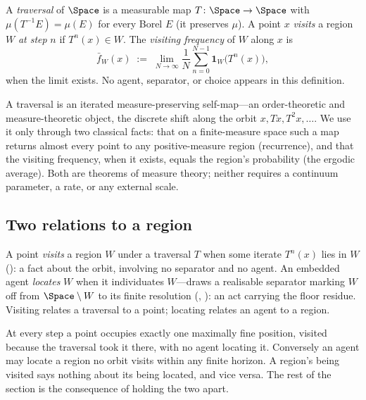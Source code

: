 \begin{definition}
\label{def:traversal}
A \emph{traversal} of $\Space$ is a measurable map $T\colon\Space\to\Space$ with
$\mu(T^{-1}E)=\mu(E)$ for every Borel $E$ \textup{(}it preserves $\mu$\textup{)}.
A point $x$ \emph{visits} a region $W$ \emph{at step} $n$ if $T^{n}(x)\in W$. The
\emph{visiting frequency} of $W$ along $x$ is
\[
\bar f_W(x)\;:=\;\lim_{N\to\infty}\frac1N\sum_{n=0}^{N-1}\mathbf 1_W\!\bigl(T^{n}(x)\bigr),
\]
when the limit exists. No agent, separator, or choice appears in this definition.
\end{definition}

\begin{remark}
\label{rem:not-dynamics}
A traversal is an iterated measure-preserving self-map---an order-theoretic and
measure-theoretic object, the discrete shift along the orbit
$x,Tx,T^2x,\dots$. We use it only through two classical facts: that on a
finite-measure space such a map returns almost every point to any positive-measure
region (recurrence), and that the visiting frequency, when it exists, equals the
region's probability (the ergodic average). Both are theorems of measure theory;
neither requires a continuum parameter, a rate, or any external scale.
\end{remark}

\subsection{Two relations to a region}

\begin{definition}
\label{def:visit-locate}
A point \emph{visits} a region $W$ under a traversal $T$ when some iterate
$T^{n}(x)$ lies in $W$ \textup{(}\textup{)}: a fact about the
orbit, involving no separator and no agent. An embedded agent \emph{locates} $W$
when it individuates $W$---draws a realisable separator marking $W$ off from
$\Space\setminus W$ to its finite resolution \textup{(},
\textup{)}: an act carrying the floor residue. Visiting
relates a traversal to a point; locating relates an agent to a region.
\end{definition}

\begin{remark}
\label{rem:two-relations}
At every step a point occupies exactly one maximally fine position, visited
because the traversal took it there, with no agent locating it. Conversely an
agent may locate a region no orbit visits within any finite horizon. A region's
being visited says nothing about its being located, and vice versa. The rest of
the section is the consequence of holding the two apart.
\end{remark}

